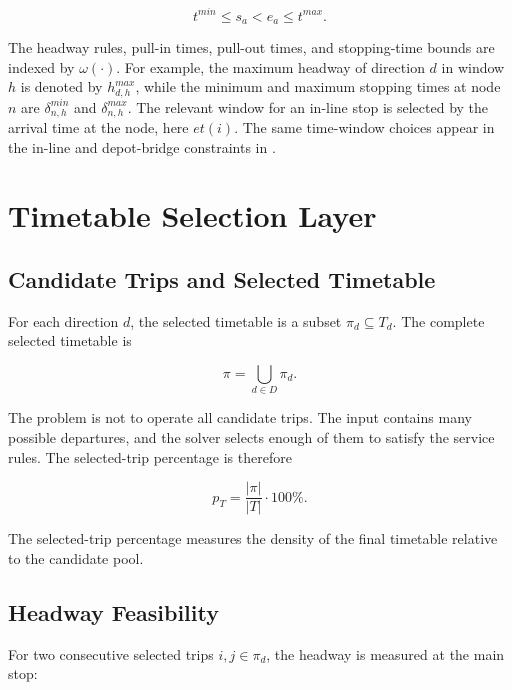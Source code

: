 \begin{equation}
t^{min}\le s_a < e_a \le t^{max}.
\label{eq:horizon-activity}
\end{equation}

The headway rules, pull-in times, pull-out times, and stopping-time bounds are
indexed by \(\omega(\cdot)\). For example, the maximum headway of direction
\(d\) in window \(h\) is denoted by \(h^{max}_{d,h}\), while the minimum and
maximum stopping times at node \(n\) are
\(\delta^{min}_{n,h}\) and \(\delta^{max}_{n,h}\). The relevant window for an
in-line stop is selected by the arrival time at the node, here \(et(i)\). The
same time-window choices appear in the in-line and depot-bridge constraints
in .

\section{Timetable Selection Layer}

\subsection{Candidate Trips and Selected Timetable}

For each direction \(d\), the selected timetable is a subset
\(\pi_d\subseteq T_d\). The complete selected timetable is

\begin{equation}
\pi=\bigcup_{d\in D}\pi_d .
\label{eq:problem-selected-timetable}
\end{equation}

The problem is not to operate all candidate trips. The input contains many
possible departures, and the solver selects enough of them to satisfy the
service rules. The selected-trip percentage is therefore

\begin{equation}
p_T=\frac{|\pi|}{|T|}\cdot 100\%.
\label{eq:problem-selected-share}
\end{equation}

The selected-trip percentage measures the density of the final timetable
relative to the candidate pool.

\subsection{Headway Feasibility}
\label{sec:headway-feasibility}

For two consecutive selected trips \(i,j\in\pi_d\), the headway is measured at
the main stop:

